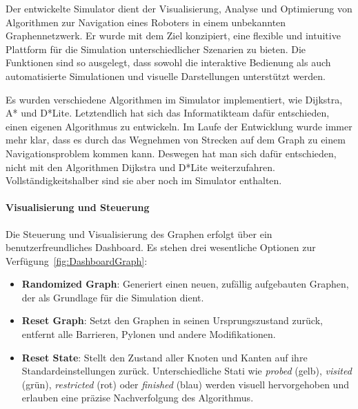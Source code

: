 \documentclass[main.tex]{subfiles} %
\begin{document}
Der entwickelte Simulator dient der Visualisierung, Analyse und
Optimierung von Algorithmen zur Navigation eines Roboters in einem
unbekannten Graphennetzwerk. Er wurde mit dem Ziel konzipiert, eine
flexible und intuitive Plattform für die Simulation unterschiedlicher
Szenarien zu bieten. Die Funktionen sind so ausgelegt, dass sowohl
die interaktive Bedienung als auch automatisierte Simulationen und
visuelle Darstellungen unterstützt werden.

Es wurden verschiedene Algorithmen im Simulator implementiert, wie
Dijkstra, A* und D*Lite. Letztendlich hat sich das Informatikteam
dafür entschieden, einen eigenen Algorithmus zu entwickeln. Im Laufe
der Entwicklung wurde immer mehr klar, dass es durch das Wegnehmen
von Strecken auf dem Graph zu einem Navigationsproblem kommen kann.
Deswegen hat man sich dafür entschieden, nicht mit den Algorithmen
Dijkstra und D*Lite weiterzufahren. Vollständigkeitshalber sind sie
aber noch im Simulator enthalten.

\paragraph{Visualisierung und Steuerung}

Die Steuerung und Visualisierung des Graphen erfolgt über ein
benutzerfreundliches Dashboard. Es stehen drei wesentliche Optionen
zur Verfügung~\ref{fig:DashboardGraph}:

\begin{itemize}
  \item \textbf{Randomized Graph}:
    Generiert einen neuen, zufällig aufgebauten Graphen, der als
    Grundlage für die Simulation dient.

  \item \textbf{Reset Graph}:
    Setzt den Graphen in seinen Ursprungszustand zurück, entfernt
    alle Barrieren, Pylonen und andere Modifikationen.

  \item \textbf{Reset State}:
    Stellt den Zustand aller Knoten und Kanten auf ihre
    Standardeinstellungen zurück. Unterschiedliche Stati wie
    \emph{probed} (gelb), \emph{visited} (grün), \emph{restricted}
    (rot) oder \emph{finished} (blau) werden visuell hervorgehoben
    und erlauben eine präzise Nachverfolgung des Algorithmus.
\end{itemize}
\end{document}
